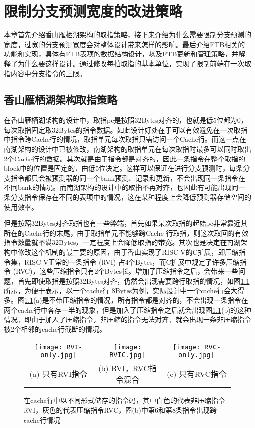 \chapter{限制分支预测宽度的改进策略}

本章首先介绍香山雁栖湖架构的取指策略，接下来介绍为什么需要限制分支预测的宽度，过宽的分支预测宽度会对整体设计带来怎样的影响。最后介绍FTB相关的功能和实现，具体有FTB表项的数据结构设计，以及FTB更新和管理策略，并解释了为什么要这样设计。通过修改每拍取指的基本单位，实现了限制前端在一次取指内容中分支指令的上限。

\section{香山雁栖湖架构取指策略}

在香山雁栖湖架构的设计中，取指pc是按照32Bytes对齐的，也就是低5位都为0，每次取指固定取32Bytes的指令数据。如此设计好处在于可以有效避免在一次取指中指令跨Cache行的情况，取指单元每次取指只需访问一个Cache行。而这一点在南湖架构的设计中已被修改，南湖架构的取指单元在每次取指时最多可以同时取出2个Cache行的数据。其次就是由于指令都是对齐的，因此一条指令在整个取指的block中的位置是固定的，由低5位决定。这样可以保证在进行分支预测时，每条分支指令都只会被预测器的同一个bank预测、记录和更新，不会出现同一条指令在不同bank的情况。而南湖架构的设计中的取指不再对齐，也因此有可能出现同一条分支指令保存在不同的表项中的情况，这在某种程度上会降低预测器存储空间的使用效率。

但是按照32Bytes对齐取指也有一些弊端，首先如果某次取指的起始pc非常靠近其所在的Cache行的末尾，由于取指单元不能够跨Cache 行取指，则这次取回的有效指令数量就不满32Bytes，一定程度上会降低取指的带宽。其次也是决定在南湖架构中修改这个机制的最主要的原因，由于香山实现了RISC-V的C扩展，即压缩指令集，RISC-V正常的一条指令 (RVI) 占4个Bytes，而C扩展中规定了许多压缩指令 (RVC)，这些压缩指令只有2个Bytes长。增加了压缩指令之后，会带来一些问题，首先即使取指是按照32Bytes对齐，仍然会出现需要跨行取指的情况，如图\ref{fig:figure31}所示，为便于表示，以一个cache行 8Bytes为例，实际设计中一个cache行会大得多。图\ref{fig:figure31}(a)是不带压缩指令的情况，所有指令都是对齐的，不会出现一条指令在两个cache行中各存一半的现象，但是加入了压缩指令之后就会出现图\ref{fig:figure31}(b)的这种情况，即由于加入了压缩指令，非压缩的指令无法对齐，就会出现一条非压缩指令被2个相邻的cache行截断的情况。

\begin{figure}[htb]
    \centering
    \setlength\tabcolsep{3pt}  %
    \vspace{5pt} %
    \begin{tabular}{ccc}
        \texttt{[image: RVI-only.jpg]} &
        \texttt{[image: RVIC.jpg]} &
        \texttt{[image: RVC-only.jpg]} \\
        (a) 只有RVI指令 & (b) RVI，RVC指令混合 & (c) 只有RVC指令 \\[1ex]
    \end{tabular}
    \caption{在cache行中以不同形式储存的指令码，其中白色的代表非压缩指令RVI，灰色的代表压缩指令RVC，图(b)中第6和第8条指令出现跨cache行情况}
    \label{fig:figure31}
\end{figure}

